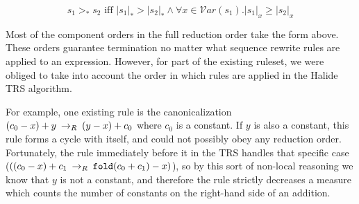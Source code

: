 \[
s_1 >_* s_2 \textrm{ iff } |s_1|_* > |s_2|_* \wedge \forall x \in \mathcal{V}ar(s_1) . |s_1|_x \geq |s_2|_x
\]

Most of the component orders in the full reduction order take the form above. These orders guarantee termination no matter what sequence rewrite rules are applied to an expression. However, for part of the existing ruleset, we were obliged to take into account the order in which rules are applied in the Halide TRS algorithm.

For example, one existing rule is the canonicalization $(c_0 - x) + y \:\rightarrow_{R}\: (y - x) + c_0$ where $c_0$ is a constant. If $y$ is also a constant, this rule forms a cycle with itself, and could not possibly obey any reduction order. Fortunately, the rule immediately before it in the TRS handles that specific case ($((c_0 - x) + c_1 \:\rightarrow_{R}\: \texttt{fold}(c_0 + c_1) - x)$), so by this sort of non-local reasoning we know that $y$ is not a constant, and therefore the rule strictly decreases a measure which counts the number of constants on the right-hand side of an addition.





